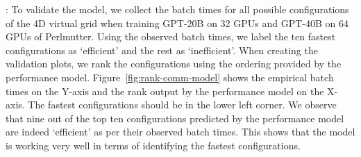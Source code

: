 \vspace{0.08in}
: To validate the model, we
collect the batch times for all possible configurations of the 4D virtual grid
when training GPT-20B on 32 GPUs and GPT-40B on 64 GPUs of Perlmutter. Using
the observed batch times, we label the ten fastest configurations as `efficient'
and the rest as `inefficient'. When creating the validation plots, we rank the
configurations using the ordering provided by the performance model.
Figure~\ref{fig:rank-comm-model} shows the empirical batch times on the Y-axis
and the rank output by the performance model on the X-axis. The fastest
configurations should be in the lower left corner. We observe that nine out of
the top ten configurations predicted by the performance model are indeed
`efficient' as per their observed batch times. This shows that the model is
working very well in terms of identifying the fastest configurations. 

